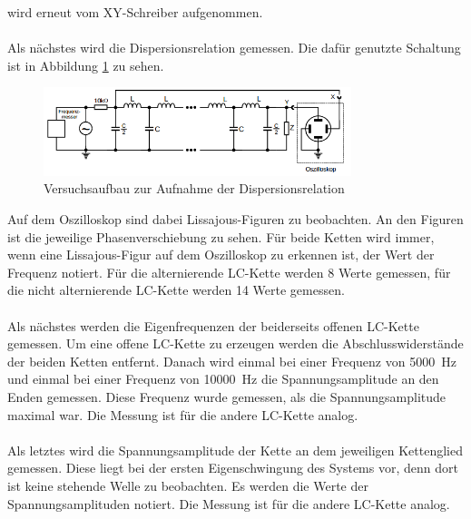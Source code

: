 \documentclass[
  bibliography=totoc,     %
  captions=tableheading,  %
  titlepage=firstiscover, %
]{scrartcl}
\begin{document}
wird erneut vom XY-Schreiber aufgenommen.  \\
\\
Als nächstes wird die Dispersionsrelation gemessen. Die dafür genutzte Schaltung
ist in Abbildung \ref{fig:V3562} zu sehen.
\begin{figure}[htb]
  \centering
  \includegraphics[width=0.8\textwidth]{V3562.png}
  \caption{Versuchsaufbau zur Aufnahme der Dispersionsrelation}
  \label{fig:V3562}
\end{figure}
Auf dem Oszilloskop sind dabei Lissajous-Figuren zu beobachten. An den Figuren
ist die jeweilige Phasenverschiebung zu sehen. Für beide Ketten wird immer, wenn
eine Lissajous-Figur auf dem Oszilloskop zu erkennen ist, der Wert der Frequenz
notiert. Für die alternierende LC-Kette werden 8 Werte gemessen, für die
nicht alternierende LC-Kette werden 14 Werte gemessen. \\
\\
Als nächstes werden die Eigenfrequenzen der beiderseits offenen LC-Kette
gemessen. Um eine offene LC-Kette zu erzeugen werden die Abschlusswiderstände
der beiden Ketten entfernt. Danach wird einmal bei einer Frequenz von \SI{5000}{Hz}
und einmal bei einer Frequenz von \SI{10000}{Hz} die Spannungsamplitude an den
Enden gemessen. Diese Frequenz wurde gemessen, als die Spannungsamplitude maximal war.
Die Messung ist für die andere LC-Kette analog. \\
\\
Als letztes wird die Spannungsamplitude der Kette an dem jeweiligen
Kettenglied gemessen. Diese liegt bei der ersten Eigenschwingung des Systems
vor, denn dort ist keine stehende Welle zu beobachten. Es werden die Werte der
Spannungsamplituden notiert.
Die Messung ist für die andere LC-Kette analog.
\end{document}

